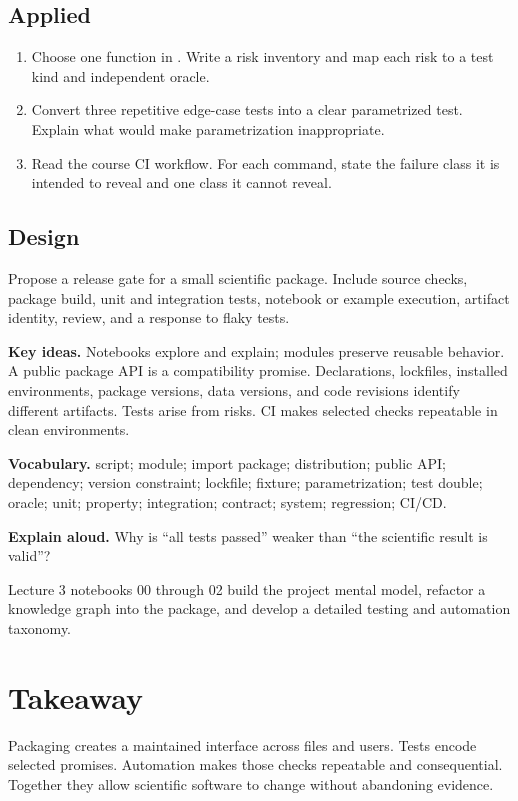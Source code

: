 \subsection*{Applied}
\begin{enumerate}
  \item Choose one function in . Write a risk inventory and map
  each risk to a test kind and independent oracle.
  \item Convert three repetitive edge-case tests into a clear parametrized test.
  Explain what would make parametrization inappropriate.
  \item Read the course CI workflow. For each command, state the failure class it
  is intended to reveal and one class it cannot reveal.
\end{enumerate}

\subsection*{Design}
Propose a release gate for a small scientific package. Include source checks,
package build, unit and integration tests, notebook or example execution,
artifact identity, review, and a response to flaky tests.

\begin{chapterreview}
\textbf{Key ideas.} Notebooks explore and explain; modules preserve reusable
behavior. A public package API is a compatibility promise. Declarations,
lockfiles, installed environments, package versions, data versions, and code
revisions identify different artifacts. Tests arise from risks. CI makes
selected checks repeatable in clean environments.

\textbf{Vocabulary.} script; module; import package; distribution; public API;
dependency; version constraint; lockfile; fixture; parametrization; test double;
oracle; unit; property; integration; contract; system; regression; CI/CD.

\textbf{Explain aloud.} Why is ``all tests passed'' weaker than ``the scientific
result is valid''?
\end{chapterreview}

\begin{notebooklink}
Lecture 3 notebooks 00 through 02 build the project mental model, refactor a
knowledge graph into the package, and develop a detailed testing and automation
taxonomy.
\end{notebooklink}

\section{Takeaway}

Packaging creates a maintained interface across files and users. Tests encode
selected promises. Automation makes those checks repeatable and consequential.
Together they allow scientific software to change without abandoning evidence.
